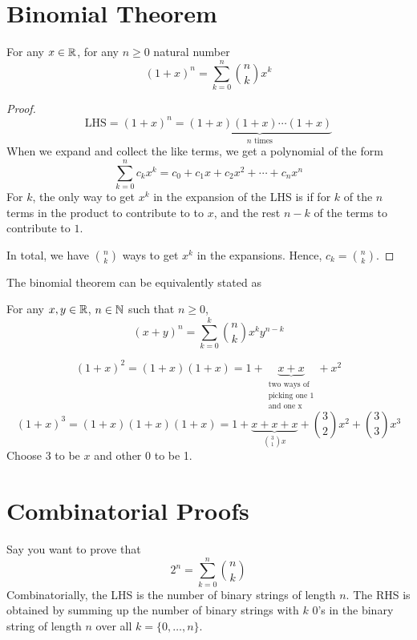 



\section{Binomial Theorem}

\begin{theorem}
    For any $x \in \mathbb{R}$, for any $n \geq 0$ natural number
    $$
    (1+x)^n = \sum_{k=0}^n \binom{n}{k} x^k
    $$
\end{theorem}

\begin{proof}
    $$
    \text{LHS} = (1+x)^n = \underbrace{(1+x) (1+x) \cdots (1+x)}_{\text{$n$ times}}
    $$
    When we expand and collect the like terms, we get a polynomial of the form
    $$
    \sum_{k=0}^n c_k x^k = c_0 + c_1x + c_2 x^2 + \cdots + c_n x^n
    $$
    For $k$, the only way to get $x^k$ in the expansion of the LHS is if for $k$ of the $n$ terms in the product to contribute to to $x$, and the rest $n-k$ of the terms to contribute to $1$.

    In total, we have $\binom{n}{k}$ ways to get $x^k$ in the expansions. Hence, $c_k = \binom{n}{k}$.
\end{proof}

The binomial theorem can be equivalently stated as
\begin{theorem}
    For any $x,y \in \mathbb{R}$, $n \in \mathbb{N}$ such that $n \geq 0$,
    $$
    (x+y)^n = \sum_{k=0}^k \binom{n}{k} x^k y^{n-k}
    $$
\end{theorem}

\begin{example}
    $$
    (1+x)^2 = (1 + x)(1 + x) = 1 + \underbrace{x + x}_{\substack{\text{two ways of} \\  \text{picking one 1} \\ \text{and one x}}} + x^2
    $$
    $$
    (1+x)^3 = (1+x) (1+x) (1+x) = 1 + \underbrace{x + x + x}_{\binom{3}{1}x} + \binom{3}{2} x^2 + \binom{3}{3}x^3
    $$
    Choose 3 to be $x$ and other 0 to be 1.
\end{example}

\section{Combinatorial Proofs}

Say you want to prove that
$$
2^n = \sum_{k=0}^n \binom{n}{k}
$$
Combinatorially, the LHS is the number of binary strings of length $n$. The RHS is obtained by summing up the number of binary strings with $k$ 0's in the binary string of length $n$ over all $k = \{0,\ldots,n\}$.

